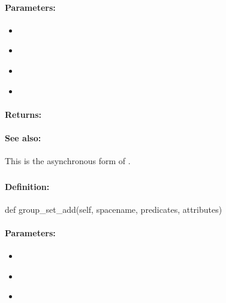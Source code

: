 \paragraph{Parameters:}
\begin{itemize}[noitemsep]
\item {}\\

\item {}\\

\item {}\\

\item {}\\

\end{itemize}

\paragraph{Returns:}


\paragraph{See also:}  This is the asynchronous form of .

\pagebreak
\subsubsection{}
\label{api:python:group_set_add}


\paragraph{Definition:}
\begin{pythoncode}
def group_set_add(self, spacename, predicates, attributes)
\end{pythoncode}

\paragraph{Parameters:}
\begin{itemize}[noitemsep]
\item {}\\

\item {}\\

\item {}\\

\end{itemize}

